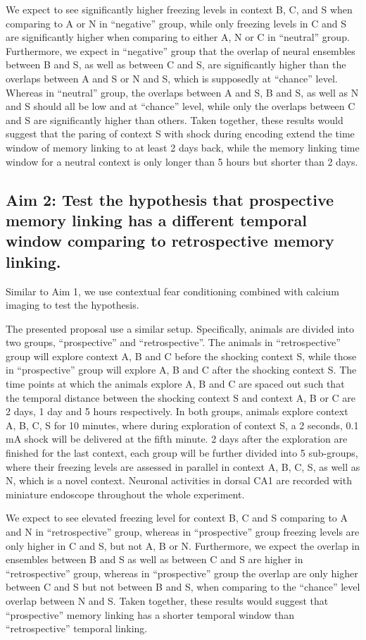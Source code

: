 \documentclass[master.tex]{subfiles}
\begin{document}
We expect to see significantly higher freezing levels in context B, C, and S
when comparing to A or N in ``negative'' group, while only freezing levels in C
and S are significantly higher when comparing to either A, N or C in ``neutral''
group. Furthermore, we expect in ``negative'' group that the overlap of neural
ensembles between B and S, as well as between C and S, are significantly higher
than the overlaps between A and S or N and S, which is supposedly at ``chance''
level. Whereas in ``neutral'' group, the overlaps between A and S, B and S, as
well as N and S should all be low and at ``chance'' level, while only the
overlaps between C and S are significantly higher than others. Taken together,
these results would suggest that the paring of context S with shock during
encoding extend the time window of memory linking to at least 2 days back, while
the memory linking time window for a neutral context is only longer than 5 hours
but shorter than 2 days.


\subsection*{Aim 2: Test the hypothesis that prospective memory linking has a
  different temporal window comparing to retrospective memory linking.}

Similar to Aim 1, we use contextual fear conditioning combined with calcium
imaging to test the hypothesis.


The presented proposal use a similar setup. Specifically, animals are divided
into two groups, ``prospective'' and ``retrospective''. The animals in
``retrospective'' group will explore context A, B and C before the shocking
context S, while those in ``prospective'' group will explore A, B and C after
the shocking context S. The time points at which the animals explore A, B and C
are spaced out such that the temporal distance between the shocking context S
and context A, B or C are 2 days, 1 day and 5 hours respectively. In both
groups, animals explore context A, B, C, S for 10 minutes, where during
exploration of context S, a 2 seconds, 0.1 mA shock will be delivered at the
fifth minute. 2 days after the exploration are finished for the last context,
each group will be further divided into 5 sub-groups, where their freezing
levels are assessed in parallel in context A, B, C, S, as well as N, which is a
novel context. Neuronal activities in dorsal CA1 are recorded with miniature
endoscope throughout the whole experiment.

We expect to see elevated freezing level for context B, C and S comparing to A
and N in ``retrospective'' group, whereas in ``prospective'' group freezing
levels are only higher in C and S, but not A, B or N. Furthermore, we expect the
overlap in ensembles between B and S as well as between C and S are higher in
``retrospective'' group, whereas in ``prospective'' group the overlap are only
higher between C and S but not between B and S, when comparing to the ``chance''
level overlap between N and S. Taken together, these results would suggest that
``prospective'' memory linking has a shorter temporal window than
``retrospective'' temporal linking.
\end{document}
